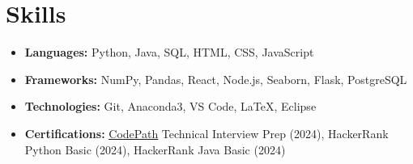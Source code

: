 \documentclass[letterpaper,11pt]{article}
\makeatletter
\newcommand{\resumeItem}[1]{
  \item\small{
    {#1 \vspace{-3pt}}
  }
}
\newcommand{\resumeSubheading}[4]{
  \vspace{-2pt}\item
    \begin{tabular*}{0.97\textwidth}[t]{l@{\extracolsep{\fill}}r@{\hspace{-0.2in}}}
        \textbf{#1} & #2 \\
        \textit{\small#3} & \textit{\small #4} \\
    \end{tabular*}\vspace{-1pt}
}
\newcommand{\resumeSubHeadingListStart}{\begin{itemize}[leftmargin=0.00in, rightmargin=-0.2in, label={}]}
\newcommand{\resumeItemListStart}{\begin{itemize}[leftmargin=0.15in, rightmargin=0.15in]}
\newcommand{\resumeItemListEnd}{\end{itemize}\vspace{-7pt}}
\makeatother
\begin{document}
\section{Skills}
    \vspace*{3pt}
    \begin{itemize}[itemsep=-0.05in, leftmargin=0.05in, label={}]
        \item \small{
            \textbf{Languages: } Python, Java, SQL, HTML, CSS, JavaScript
        }
        \item \small{
            \textbf{Frameworks: } NumPy, Pandas, React, Node.js, Seaborn, Flask, PostgreSQL
        }
        \item \small{
            \textbf{Technologies: } Git, Anaconda3, VS Code, LaTeX, Eclipse
        }
        \item \small{
            \textbf{Certifications: } \href{https://www.codepath.org/}{\underline{CodePath}} Technical Interview Prep (2024), HackerRank Python Basic (2024), HackerRank Java Basic (2024)
        }
    \end{itemize}



\end{document}
